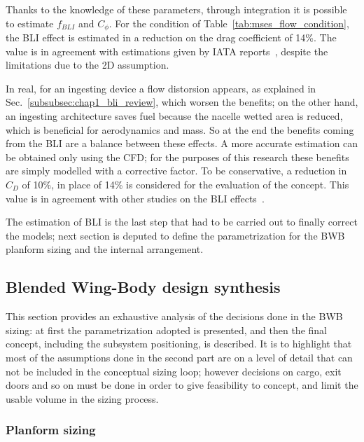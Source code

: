 Thanks to the knowledge of these parameters, through integration it is possible to estimate $f_{BLI}$ and $C_{\phi}$. 
For the condition of Table~\ref{tab:mses_flow_condition}, the BLI effect is estimated in a reduction on the drag coefficient of 14\%. 
The value is in agreement with estimations given by IATA reports~\cite{bib:iata_annex}, despite the limitations due to the 2D assumption. 

In real, for an ingesting device a flow distorsion appears, as explained in Sec.~\ref{subsubsec:chap1_bli_review}, which worsen the benefits; on the other hand, an ingesting architecture saves fuel because the nacelle wetted area is reduced, which is beneficial for aerodynamics and mass. 
So at the end the benefits coming from the BLI are a balance between these effects. 
A more accurate estimation can be obtained only using the CFD; for the purposes of this research these benefits are simply modelled with a corrective factor. 
To be conservative, a reduction in $C_D$ of 10\%, in place of 14\% is considered for the evaluation of the concept. 
This value is in agreement with other studies on the BLI effects~\cite{bib:iata_annex, bib:steiner_2012, bib:uranga}.

The estimation of BLI is the last step that had to be carried out to finally correct the models; next section is deputed to define the parametrization for the BWB planform sizing and the internal arrangement. 

\subsection{Blended Wing-Body design synthesis}
\label{subsec:chap4_bwb_arrangement}

This section provides an exhaustive analysis of the decisions done in the BWB sizing: at first the parametrization adopted is presented, and then the final concept, including the subsystem positioning, is described.
It is to highlight that most of the assumptions done in the second part are on a level of detail that can not be included in the conceptual sizing loop; however decisions on cargo, exit doors and so on must be done in order to give feasibility to concept, and limit the usable volume in the sizing process. 

\subsubsection{Planform sizing}
\label{subsubsec:chap4_bwb_centerbody_sizing}

